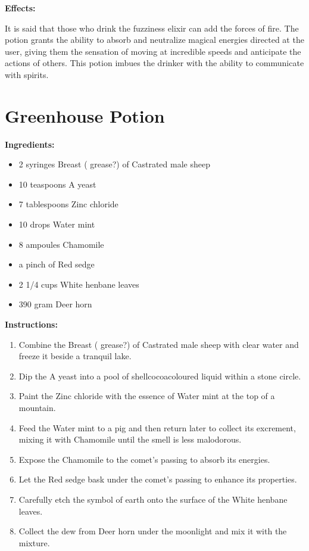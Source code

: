 \documentclass{article}
\begin{document}
\textbf{Effects:}

It is said that those who drink the fuzziness elixir can add the forces of fire. The potion grants the ability to absorb and neutralize magical energies directed at the user, giving them the sensation of moving at incredible speeds and anticipate the actions of others. This potion imbues the drinker with the ability to communicate with spirits.

\newpage
\section*{Greenhouse Potion}

\textbf{Ingredients:}

\begin{itemize}
  \item 2 syringes Breast ( grease?) of Castrated male sheep
  \item 10 teaspoons A yeast
  \item 7 tablespoons Zinc chloride
  \item 10 drops Water mint
  \item 8 ampoules Chamomile
  \item a pinch of Red sedge
  \item 2 1/4 cups White henbane leaves
  \item 390 gram Deer horn
\end{itemize}

\textbf{Instructions:}

\begin{enumerate}
  \item Combine the Breast ( grease?) of Castrated male sheep with clear water and freeze it beside a tranquil lake.
  \item Dip the A yeast into a pool of shellcocoacoloured liquid within a stone circle.
  \item Paint the Zinc chloride with the essence of Water mint at the top of a mountain.
  \item Feed the Water mint to a pig and then return later to collect its excrement, mixing it with Chamomile until the smell is less malodorous.
  \item Expose the Chamomile to the comet’s passing to absorb its energies.
  \item Let the Red sedge bask under the comet’s passing to enhance its properties.
  \item Carefully etch the symbol of earth onto the surface of the White henbane leaves.
  \item Collect the dew from Deer horn under the moonlight and mix it with the mixture.
\end{enumerate}
\end{document}

